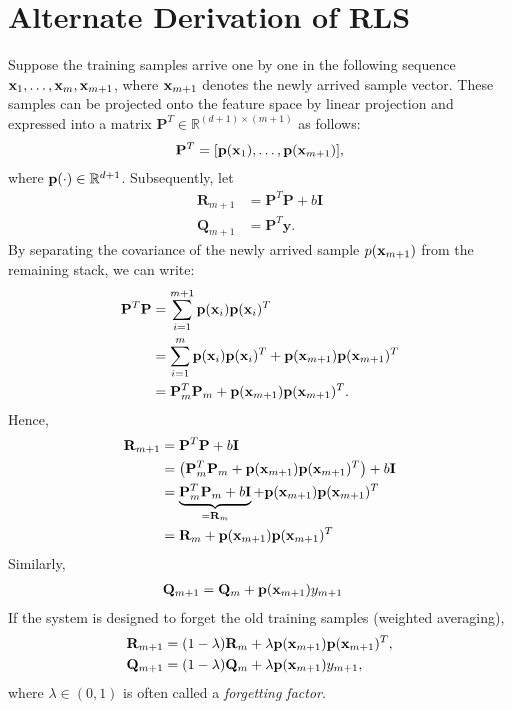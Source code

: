 \section{Alternate Derivation of RLS}
Suppose the training samples arrive one by one in the following sequence ${\mathbf{x}}_1, \dots, {\mathbf{x}}_m, {\mathbf{x}}_{m+1}$, where ${\mathbf{x}}_{m+1}$ denotes the newly arrived sample vector. These samples can be projected onto the feature space by linear projection and expressed into a matrix $\mathbf{P}^T \in \mathbb{R}^{(d+1)\times (m+1)}$ as follows:
\begin{align*}
	\mathbf{P}^T = [{\mathbf{p}}({\mathbf{x}}_1), \dots, {\mathbf{p}}({\mathbf{x}}_{m+1})],
\end{align*}
where ${\mathbf{p}}(\cdot)\in \mathbb{R}^{d+1}$. Subsequently, let 
\begin{align*}
	\mathbf{R}_{m+1} &= \mathbf{P}^T \mathbf{P} + b\mathbf{I}\\
	\mathbf{Q}_{m+1} &= \mathbf{P}^T \mathbf{y}.
\end{align*}
By separating the covariance of the newly arrived sample \( p({\mathbf{x}}_{m+1}) \) from the remaining stack, we can write:
\begin{align*}
	\mathbf{P}^T \mathbf{P} &= \sum_{i=1}^{m+1} {\mathbf{p}}({\mathbf{x}}_i) {\mathbf{p}}({\mathbf{x}}_i)^T\\
							&= \sum_{i=1}^m {\mathbf{p}}({\mathbf{x}}_i) {\mathbf{p}}({\mathbf{x}}_i)^T + {\mathbf{p}}({\mathbf{x}}_{m+1}) {\mathbf{p}}({\mathbf{x}}_{m+1})^T\\
							&= \mathbf{P}_m^T \mathbf{P}_m + {\mathbf{p}}({\mathbf{x}}_{m+1}) {\mathbf{p}}({\mathbf{x}}_{m+1})^T.
\end{align*}
Hence, 
\begin{align*}
	\mathbf{R}_{m+1} &= \mathbf{P}^T \mathbf{P} + b\mathbf{I}\\
					 &= \left(\mathbf{P}_m^T \mathbf{P}_m + {\mathbf{p}}({\mathbf{x}}_{m+1}) {\mathbf{p}}({\mathbf{x}}_{m+1})^T\right)+ b\mathbf{I}\\
					 &= \underbrace{\mathbf{P}_m^T \mathbf{P}_m + b\mathbf{I}}_{=\mathbf{R}_m} + {\mathbf{p}}({\mathbf{x}}_{m+1}){\mathbf{p}}({\mathbf{x}}_{m+1})^T\\
					 &= \mathbf{R}_m + {\mathbf{p}}({\mathbf{x}}_{m+1}) {\mathbf{p}}({\mathbf{x}}_{m+1})^T
\end{align*}
Similarly, 
\begin{align*}
	\mathbf{Q}_{m+1} &= \mathbf{Q}_m + {\mathbf{p}}({\mathbf{x}}_{m+1}) y_{m+1}
\end{align*}
If the system is designed to forget the old training samples (\ie weighted averaging), 
\begin{align*}
	\mathbf{R}_{m+1} &= (1 - \lambda) \mathbf{R}_m + \lambda {\mathbf{p}}({\mathbf{x}}_{m+1}) {\mathbf{p}}({\mathbf{x}}_{m+1})^T,\\
	\mathbf{Q}_{m+1} &= (1 - \lambda) \mathbf{Q}_m + \lambda {\mathbf{p}}({\mathbf{x}}_{m+1}) y_{m+1},
\end{align*}
where \( \lambda \in (0, 1) \) is often called a \textit{forgetting factor}.

